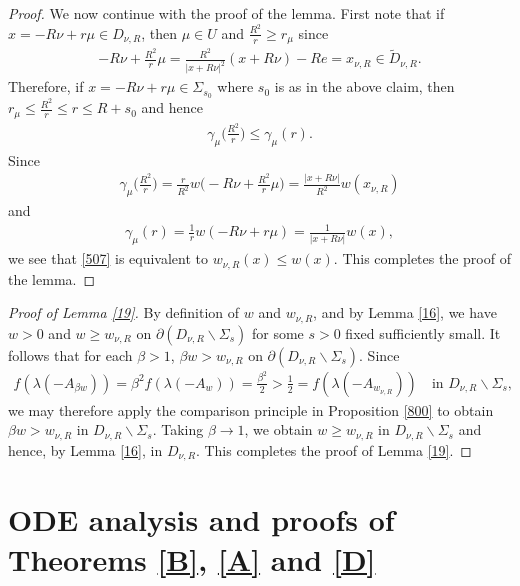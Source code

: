 \documentclass[12pt]{article}
\numberwithin{equation}{section}
\theoremstyle{plain}
\theoremstyle{definition}
\begin{document}
\begin{proof}
	
	We now continue with the proof of the lemma. First note that if $x = -R\nu  + r\mu \in D_{\nu,R}$, then $\mu\in U$ and $\frac{R^2}{r}\geq r_\mu$ since
	\begin{align*}
	-R\nu  + \frac{R^2}{r}\mu = \frac{R^2}{|x+R\nu |^2}(x+R\nu ) - Re = x_{\nu,R} \in \widetilde{D}_{\nu,R}.
	\end{align*} 
	Therefore, if $x = -R\nu  + r\mu \in\Sigma_{s_0}$ where $s_0$ is as in the above claim, then $r_\mu \leq \frac{R^2}{r}\leq r \leq R+s_0$ and hence 
	\begin{align}\label{507}
	\gamma_\mu\bigg(\frac{R^2}{r}\bigg) \leq \gamma_\mu(r). 
	\end{align}  
	Since
	\begin{align*}
	\gamma_\mu\bigg(\frac{R^2}{r}\bigg) =  \frac{r}{R^2}w\bigg(\!\!-\!R\nu + \frac{R^2}{r}\mu\bigg) = \frac{|x+R\nu |}{R^2}w(x_{\nu,R})
	\end{align*} 
	and
	\begin{align*}
	\gamma_\mu(r) = \frac{1}{r}w(-R\nu +r\mu) = \frac{1}{|x+R\nu |}w(x),
	\end{align*}
	we see that \eqref{507} is equivalent to $w_{\nu,R}(x) \leq w(x)$. This completes the proof of the lemma.
\end{proof}

\begin{proof}[Proof of Lemma \ref{19}]
	By definition of $w$ and $w_{\nu,R}$, and by Lemma \ref{16}, we have $w>0$ and $w \geq w_{\nu,R}$ on $\partial(D_{\nu,R}\backslash \Sigma_s)$ for some $s>0$ fixed sufficiently small. It follows that for each $\beta>1$, $\beta w > w_{\nu,R}$ on $\partial(D_{\nu,R}\backslash \Sigma_s)$. Since 
	\begin{align*}
	f(\lambda(-A_{\beta w})) = \beta^2 f(\lambda(-A_w)) = \frac{\beta^2}{2} > \frac{1}{2} = f(\lambda(-A_{w_{\nu,R}})) \quad \text{in } D_{\nu,R}\backslash \Sigma_s,
	\end{align*}
	we may therefore apply the comparison principle in Proposition \ref{800} to obtain $\beta w > w_{\nu,R}$ in $D_{\nu,R}\backslash \Sigma_s$. Taking $\beta\rightarrow 1$, we obtain $w \geq w_{\nu,R}$ in $D_{\nu,R}\backslash \Sigma_s$ and hence, by Lemma \ref{16}, in $D_{\nu,R}$. This completes the proof of Lemma \ref{19}.
\end{proof}







\section{ODE analysis and proofs of Theorems \ref{B}, \ref{A} and \ref{D}}\label{s3}
\end{document}
